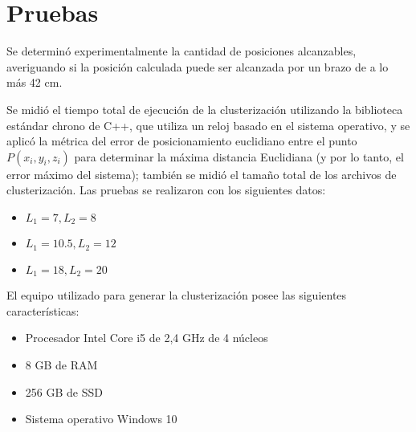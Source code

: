 \section{Pruebas}

Se determinó experimentalmente la cantidad de posiciones alcanzables, averiguando si la posición calculada puede ser alcanzada por un brazo de a lo más 42 cm.

Se midió el tiempo total de ejecución de la clusterización utilizando la biblioteca estándar chrono de C++, que utiliza un reloj basado en el sistema operativo, y se aplicó la métrica del error de posicionamiento euclidiano entre el punto $P(x_i, y_i, z_i)$ para determinar la máxima distancia Euclidiana (y por lo tanto, el error máximo del sistema); también se midió el tamaño total de los archivos de clusterización. Las pruebas se realizaron con los siguientes datos:

\begin{itemize}
	\item $L_1 = 7, L_2 = 8$
	\item $L_1 = 10.5, L_2 = 12$
	\item $L_1 = 18, L_2 = 20$
\end{itemize}

El equipo utilizado para generar la clusterización posee las siguientes características:

\begin{itemize}
	\item Procesador Intel Core i5 de 2,4 GHz de 4 núcleos
	\item 8 GB de RAM
	\item 256 GB de SSD
	\item Sistema operativo Windows 10
\end{itemize}

